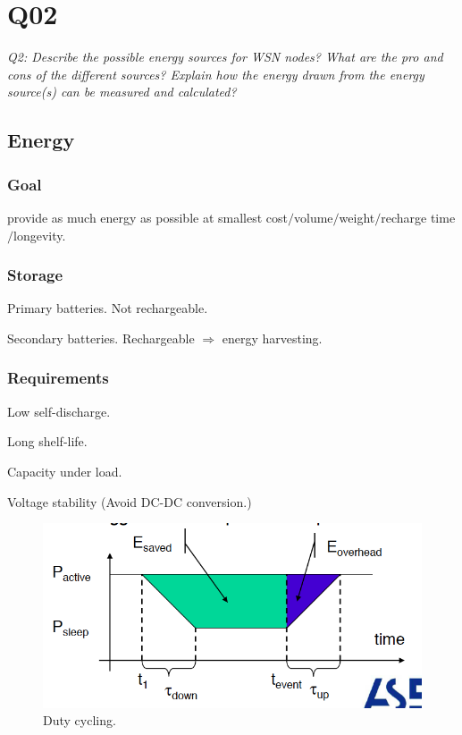 \chapter{Q02}
\emph{Q2: Describe the possible energy sources for WSN nodes? What are the pro
and cons of the different sources? Explain how the energy drawn from the energy
source(s) can be measured and calculated?}

\section{Energy}

\subsection{Goal}
\begin{description}
\item provide as much energy as possible at smallest cost$\slash$volume$\slash$weight$\slash$recharge time$\slash$longevity.
\end{description}

\subsection{Storage}
\begin{description}
\item Primary batteries. Not rechargeable.
\item Secondary batteries. Rechargeable $\Rightarrow$ energy harvesting.
\end{description}

\subsection{Requirements}
\begin{description}
\item Low self-discharge.
\item Long shelf-life.
\item Capacity under load.
\item Voltage stability (Avoid DC-DC conversion.)
\end{description}

\begin{figure}[h]
  \centering
    \includegraphics[scale=0.5]{img/EnergySources-DutyCycling.png}
    \caption{Duty cycling.}
\end{figure}

